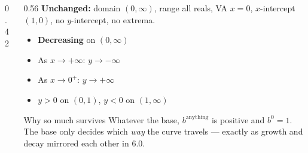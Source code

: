 \documentclass[aspectratio=169, 11pt]{beamer}
\newcommand{\lgrid}[4]{%
  \draw[step=1, linegray!45, thin] (#1,#3) grid (#2,#4);
  \draw[->, thick, charcoal] (#1,0)--(#2,0) node[below right, font=\tiny]{$x$};
  \draw[->, thick, charcoal] (0,#3)--(0,#4) node[left, font=\tiny]{$y$};}
\newcommand{\logcurve}[5]{\draw[very thick, forest, domain=#4:#5, samples=120, smooth]
  plot ({pow(#1,\x-(#3))+(#2)},{\x});}
\begin{document}
\begin{frame}[t, plain]
  \begin{columns}[T]
    \begin{column}{0.42\textwidth}
      \centering
    \end{column}
    \begin{column}{0.56\textwidth}
      \footnotesize
      \textbf{Unchanged:} domain $(0,\infty)$, range all reals, VA $x=0$, $x$-intercept $(1,0)$,
      no $y$-intercept, no extrema.
      \vspace{4pt}
      \begin{itemize}\setlength{\itemsep}{3pt}
        \item \textbf{Decreasing} on $(0,\infty)$
        \item As $x\to+\infty$: $y\to-\infty$
        \item As $x\to 0^{+}$: $y\to+\infty$
        \item $y>0$ on $(0,1)$, \; $y<0$ on $(1,\infty)$
      \end{itemize}
      \vspace{2pt}
      \begin{block}{Why so much survives}
        Whatever the base, $b^{\text{anything}}$ is positive and $b^0=1$. The base only decides which
        \emph{way} the curve travels --- exactly as growth and decay mirrored each other in 6.0.
      \end{block}
    \end{column}
  \end{columns}
\end{frame}
\end{document}
